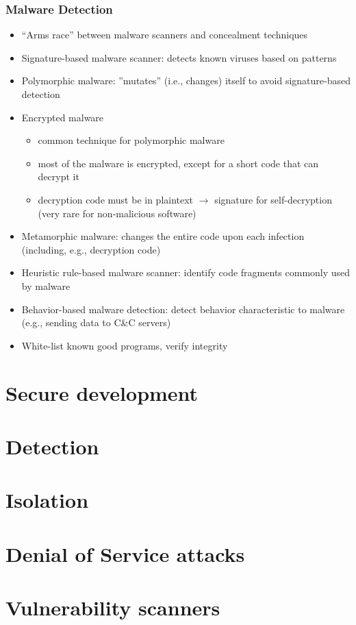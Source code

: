 \documentclass[final]{article}
\begin{document}
\subsubsection*{Malware Detection}
\begin{itemize}[nosep]
    \item ``Arms race'' between malware scanners and concealment techniques
    \item Signature-based malware scanner: detects known viruses based on patterns
    \item Polymorphic malware: ''mutates'' (i.e., changes) itself to avoid signature-based detection
    \item Encrypted malware
          \begin{itemize}[nosep]
              \item common technique for polymorphic malware
              \item most of the malware is encrypted, except for a short code that can decrypt it
              \item decryption code must be in plaintext $\rightarrow$ signature for self-decryption (very rare for non-malicious software)
          \end{itemize}
    \item Metamorphic malware: changes the entire code upon each infection (including, e.g., decryption code)
    \item Heuristic rule-based malware scanner: identify code fragments commonly used by malware
    \item Behavior-based malware detection: detect behavior characteristic to malware (e.g., sending data to C\&C servers)
    \item White-list known good programs, verify integrity
\end{itemize}
\section{Secure development}
\section{Detection}
\section{Isolation}
\section{Denial of Service attacks}
\section{Vulnerability scanners}
\end{document}
